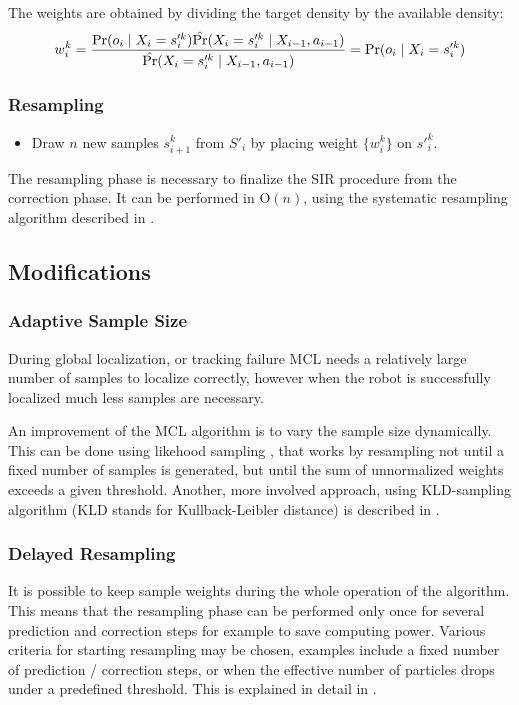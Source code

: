 The weights are obtained by dividing the target density by the available density:
\begin{equation}
	w^k_i = 
	\frac{
		\operatorname{\mathrm{Pr}}(o_i \mid X_i = s'^k_i) \hat{\operatorname{\mathrm{Pr}}}(X_i = s'^k_i \mid X_{i - 1}, a_{i - 1})
	}{
		\hat{\operatorname{\mathrm{Pr}}}(X_i =  s'^k_i \mid X_{i - 1}, a_{i - 1})
	} = \operatorname{\mathrm{Pr}}(o_i \mid X_i = s'^k_i)
\end{equation}

\subsubsection{Resampling}
\begin{itemize}
\item
Draw \(n\) new samples \(s^k_{i+1}\) from \(S'_i\) by placing
weight \(\{w^k_i\}\) on \(s'^k_{i}\).
\end{itemize}

The resampling phase is necessary to finalize the SIR procedure from the correction phase.
It can be performed in \(\mathrm{O}(n)\), using the systematic
resampling algorithm described in \cite{arulampalam01}.

\subsection{Modifications}

\subsubsection{Adaptive Sample Size}
During global localization, or tracking failure MCL needs a relatively large number
of samples to localize correctly, however when the robot is successfully localized
much less samples are necessary.

An improvement of the MCL algorithm is to vary the sample size dynamically.
This can be done using likehood sampling \cite{fox99}, that works by 
resampling not until a fixed number of samples is
generated, but until the sum of unnormalized weights exceeds a given threshold.
Another, more involved approach, using KLD-sampling algorithm
(KLD stands for Kullback-Leibler distance) is described in \cite{fox03}.

\subsubsection{Delayed Resampling}
It is possible to keep sample weights during the whole operation of the algorithm.
This means that the resampling phase can be performed only once for several prediction and correction steps
for example to save computing power.
Various criteria for starting resampling may be chosen, examples include a fixed number of
prediction / correction steps, or when the effective number of particles drops under a predefined threshold.
This is explained in detail in \cite{arulampalam01}.

